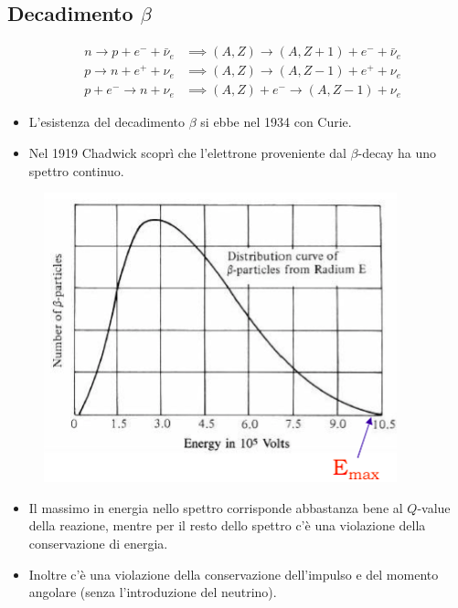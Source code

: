 \subsection{Decadimento \texorpdfstring{$\beta$}{β}}
\[
\begin{aligned}
&n \to p + e^- + \bar{\nu}_e &\implies (A, Z) \to (A, Z+1) + e^- + \bar{\nu}_e \\
&p \to n + e^+ + \nu_e &\implies (A, Z) \to (A, Z-1) + e^+ + \nu_e \\
&p + e^- \to n + \nu_e &\implies (A, Z) + e^- \to (A, Z-1) + \nu_e
\end{aligned}
\]
\begin{itemize}
    \item L'esistenza del decadimento $\beta$ si ebbe nel 1934 con Curie.
    \item Nel 1919 Chadwick scoprì che l'elettrone proveniente dal $\beta$-decay ha uno spettro continuo.
\end{itemize}
\begin{minipage}{0.6\textwidth}
    \begin{figure}[H]
        \centering
        \includegraphics[width=\textwidth]{immagini/fig_beta_decay.png}
    \end{figure}
\end{minipage}
\begin{minipage}{0.39\textwidth}
    \begin{itemize}
        \item Il massimo in energia nello spettro corrisponde abbastanza bene al $Q$-value della reazione, mentre per il resto dello spettro c'è una violazione della conservazione di energia.
        \item Inoltre c'è una violazione della conservazione dell'impulso e del momento angolare (senza l'introduzione del neutrino).
    \end{itemize}
\end{minipage}
